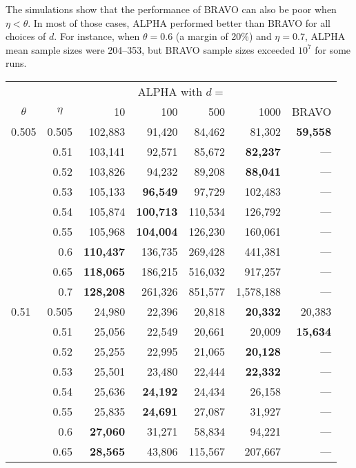 \documentclass[12pt,runningheads]{llncs}
\begin{document}
{The simulations show that the performance of BRAVO can also be poor when $\eta < \theta$.
In most of those cases, ALPHA performed better than BRAVO for all choices of $d$.
For instance, when $\theta=0.6$ (a margin of 20\%) and $\eta=0.7$,  ALPHA mean sample sizes were 204--353, but BRAVO sample sizes
exceeded $10^7$ for some runs.

\begin{table}
\centering
\tiny
\begin{tabular}{lr|rrrr|r}
  \multicolumn{2}{c|}{}    & \multicolumn{4}{|c|}{ALPHA with $d=$} & \multicolumn{1}{c}{} \\ 
\multicolumn{1}{c}{$\theta$}     &  \multicolumn{1}{c|}{$\eta$}   &  10 & 100 & 500 & 1000 & \multicolumn{1}{c}{BRAVO} \\
\hline
0.505 & 0.505 & 102,883 & 91,420 & 84,462 & 81,302  & \bf{59,558} \\
      & 0.51 & 103,141 & 92,571 & 85,672 & \bf{82,237}  & --- \\
      & 0.52 & 103,826 & 94,232 & 89,208 & \bf{88,041}  & --- \\
      & 0.53 & 105,133 & \bf{96,549} & 97,729 & 102,483  & --- \\
      & 0.54 & 105,874 & \bf{100,713} & 110,534 & 126,792  & --- \\
      & 0.55 & 105,968 & \bf{104,004} & 126,230 & 160,061  & --- \\
      & 0.6 & \bf{110,437} & 136,735 & 269,428 & 441,381  & --- \\
      & 0.65 & \bf{118,065} & 186,215 & 516,032 & 917,257  & --- \\
      & 0.7 & \bf{128,208} & 261,326 & 851,577 &  1,578,188  & --- \\
\hline
0.51 & 0.505 & 24,980 & 22,396 & 20,818 & \bf{20,332}  & 20,383 \\
     & 0.51 & 25,056 & 22,549 & 20,661 & 20,009  & \bf{15,634} \\
     & 0.52 & 25,255 & 22,995 & 21,065 & \bf{20,128}  & --- \\
     & 0.53 & 25,501 & 23,480 & 22,444 & \bf{22,332}  & --- \\
     & 0.54 & 25,636 & \bf{24,192} & 24,434 & 26,158  & --- \\
     & 0.55 & 25,835 & \bf{24,691} & 27,087 & 31,927  & --- \\
     & 0.6 & \bf{27,060} & 31,271 & 58,834 & 94,221  & --- \\
     & 0.65 & \bf{28,565} & 43,806 & 115,567 & 207,667  & --- \\

\end{tabular}
\end{table}}
\end{document}
